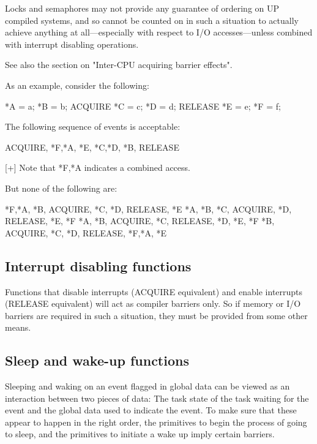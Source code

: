 Locks and semaphores may not provide any guarantee of ordering on UP compiled
systems, and so cannot be counted on in such a situation to actually achieve
anything at all---especially with respect to I/O accesses---unless combined
with interrupt disabling operations.

See also the section on "Inter-CPU acquiring barrier effects".


As an example, consider the following:

\begin{VerbatimU}
	*A = a;
	*B = b;
	ACQUIRE
	*C = c;
	*D = d;
	RELEASE
	*E = e;
	*F = f;
\end{VerbatimU}

The following sequence of events is acceptable:

\begin{VerbatimU}
	ACQUIRE, {*F,*A}, *E, {*C,*D}, *B, RELEASE

	[+] Note that {*F,*A} indicates a combined access.
\end{VerbatimU}

But none of the following are:

\begin{VerbatimU}
	{*F,*A}, *B,   ACQUIRE, *C, *D,   RELEASE, *E
	*A, *B, *C,    ACQUIRE, *D,       RELEASE, *E, *F
	*A, *B,        ACQUIRE, *C,       RELEASE, *D, *E, *F
	*B,            ACQUIRE, *C, *D,   RELEASE, {*F,*A}, *E
\end{VerbatimU}


\subsection{Interrupt disabling functions}

Functions that disable interrupts (ACQUIRE equivalent) and enable interrupts
(RELEASE equivalent) will act as compiler barriers only.
So if memory or I/O barriers are required in such a situation, they must be
provided from some other means.


\subsection{Sleep and wake-up functions}

Sleeping and waking on an event flagged in global data can be viewed as an
interaction between two pieces of data:
The task state of the task waiting for the event and the global data used
to indicate the event.
To make sure that these appear to happen in the right order, the primitives
to begin the process of going to sleep, and the primitives to initiate a
wake up imply certain barriers.

